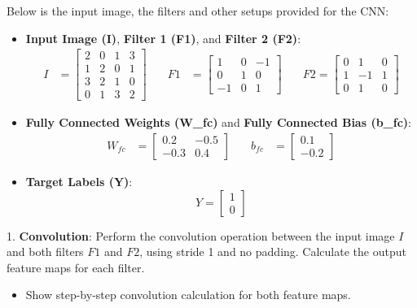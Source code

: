 \documentclass[a4 paper]{article}
\begin{document}
Below is the input image, the filters and other setups provided for the CNN:

\begin{itemize}
    \item \textbf{Input Image (I)}, \textbf{Filter 1 (F1)}, and \textbf{Filter 2 (F2)}:
    \[
    \begin{aligned}
    I &= \begin{bmatrix}
    2 & 0 & 1 & 3 \\
    1 & 2 & 0 & 1 \\
    3 & 2 & 1 & 0 \\
    0 & 1 & 3 & 2
    \end{bmatrix}
    \quad &
    F1 &= \begin{bmatrix}
    1 & 0 & -1 \\
    0 & 1 & 0 \\
    -1 & 0 & 1
    \end{bmatrix}
    \quad &
    F2 = \begin{bmatrix}
    0 & 1 & 0 \\
    1 & -1 & 1 \\
    0 & 1 & 0
    \end{bmatrix}
    \end{aligned}
    \]

    \item \textbf{Fully Connected Weights (W\_fc)} and \textbf{Fully Connected Bias (b\_fc)}:
    \[
    \begin{aligned}
    W_{fc} &= \begin{bmatrix}
    0.2 & -0.5 \\
    -0.3 & 0.4
    \end{bmatrix}
    \quad &
    b_{fc} &= \begin{bmatrix}
    0.1 \\
    -0.2
    \end{bmatrix}
    \end{aligned}
    \]

    \item \textbf{Target Labels (Y)}:
    \[
    Y = \begin{bmatrix}
    1 \\ 0
    \end{bmatrix}
    \]
\end{itemize}



1. \textbf{Convolution}: Perform the convolution operation between the input image $I$ and both filters $F1$ and $F2$, using stride 1 and no padding. Calculate the output feature maps for each filter.
    \begin{itemize}
        \item Show step-by-step convolution calculation for both feature maps.
    \end{itemize}
\end{document}
